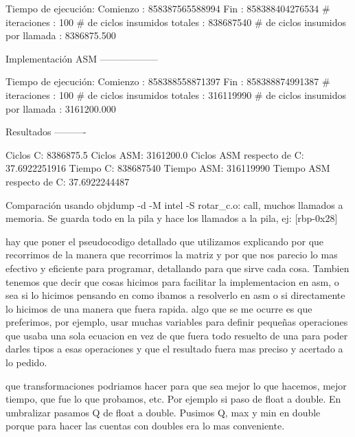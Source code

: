 \documentclass[10pt, a4paper]{article}
\begin{document}
\begin{itemize}
Tiempo de ejecución:
  Comienzo                          : 858387565588994
  Fin                               : 858388404276534
  # iteraciones                     : 100
  # de ciclos insumidos totales     : 838687540
  # de ciclos insumidos por llamada : 8386875.500

Implementación ASM
------------------

Tiempo de ejecución:
  Comienzo                          : 858388558871397
  Fin                               : 858388874991387
  # iteraciones                     : 100
  # de ciclos insumidos totales     : 316119990
  # de ciclos insumidos por llamada : 3161200.000

Resultados
----------

Ciclos C:                 8386875.5
Ciclos ASM:               3161200.0
Ciclos ASM respecto de C: 37.6922251916%
Tiempo C:                 838687540
Tiempo ASM:               316119990
Tiempo ASM respecto de C: 37.6922244487%

Comparación usando objdump -d -M intel -S rotar_c.o: call, muchos llamados a memoria. Se guarda todo en la pila y hace los llamados a la pila, ej: [rbp-0x28]


\end{itemize}

hay que poner el pseudocodigo detallado que utilizamos explicando por que recorrimos de la manera que recorrimos la matriz y por que nos parecio lo mas efectivo y eficiente para programar, detallando para que sirve cada cosa. Tambien tenemos que decir que cosas hicimos para facilitar la implementacion en asm, o sea si lo hicimos pensando en como ibamos a resolverlo en asm o si directamente lo hicimos de una manera que fuera rapida. algo que se me ocurre es que preferimos, por ejemplo, usar muchas variables para definir pequeñas operaciones que usaba una sola ecuacion en vez de que fuera todo resuelto de una para poder darles tipos a esas operaciones y que el resultado fuera mas preciso y acertado a lo pedido.\newline

que transformaciones podriamos hacer para que sea mejor lo que hacemos, mejor tiempo, que fue lo que probamos, etc. Por ejemplo si paso de float a double. En umbralizar pasamos Q de float a double. Pusimos Q, max y min en double porque para hacer las cuentas con doubles era lo mas conveniente.
\newline
\end{document}
